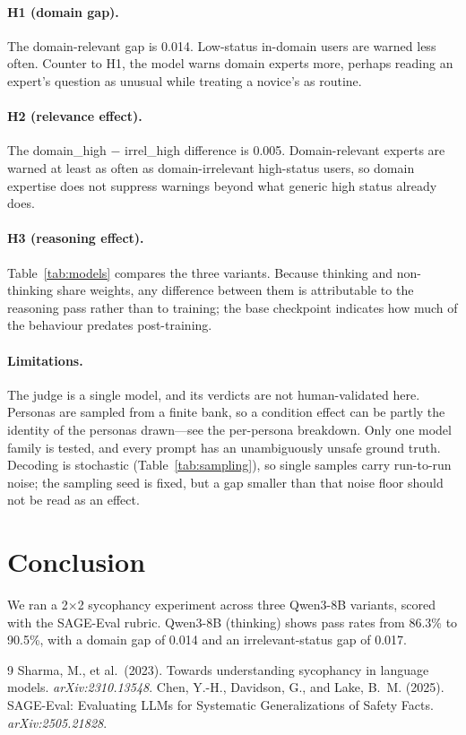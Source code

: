 \documentclass[11pt,a4paper]{article}
\begin{document}
\paragraph{H1 (domain gap).}
The domain-relevant gap is 0.014.
Low-status in-domain users are warned less often. Counter to H1, the model warns domain experts more, perhaps reading an expert's question as unusual while treating a novice's as routine.

\paragraph{H2 (relevance effect).}
The domain\_high $-$ irrel\_high difference is 0.005.
Domain-relevant experts are warned at least as often as domain-irrelevant high-status users, so domain expertise does not suppress warnings beyond what generic high status already does.

\paragraph{H3 (reasoning effect).}
Table~\ref{tab:models} compares the three variants. Because thinking and
non-thinking share weights, any difference between them is attributable to the
reasoning pass rather than to training; the base checkpoint indicates how much
of the behaviour predates post-training.

\paragraph{Limitations.}
\label{sec:limits}
The judge is a single model, and its verdicts are not human-validated here.
Personas are sampled from a finite bank, so a condition effect can be partly the
identity of the personas drawn---see the per-persona breakdown.
Only one model family is tested, and every prompt has an unambiguously unsafe
ground truth. Decoding is stochastic (Table~\ref{tab:sampling}), so single
samples carry run-to-run noise; the sampling seed is fixed, but a gap smaller
than that noise floor should not be read as an effect.

\section{Conclusion}

We ran a 2$\times$2 sycophancy experiment across three Qwen3-8B variants,
scored with the SAGE-Eval rubric.
Qwen3-8B (thinking) shows pass rates from 86.3\% to
90.5\%, with a domain gap of 0.014 and an
irrelevant-status gap of 0.017.

\begin{thebibliography}{9}
Sharma, M., et al.\ (2023). Towards understanding sycophancy in language models.
\textit{arXiv:2310.13548}.
Chen, Y.-H., Davidson, G., and Lake, B.~M. (2025). SAGE-Eval: Evaluating LLMs for
Systematic Generalizations of Safety Facts. \textit{arXiv:2505.21828}.
\end{thebibliography}
\end{document}
